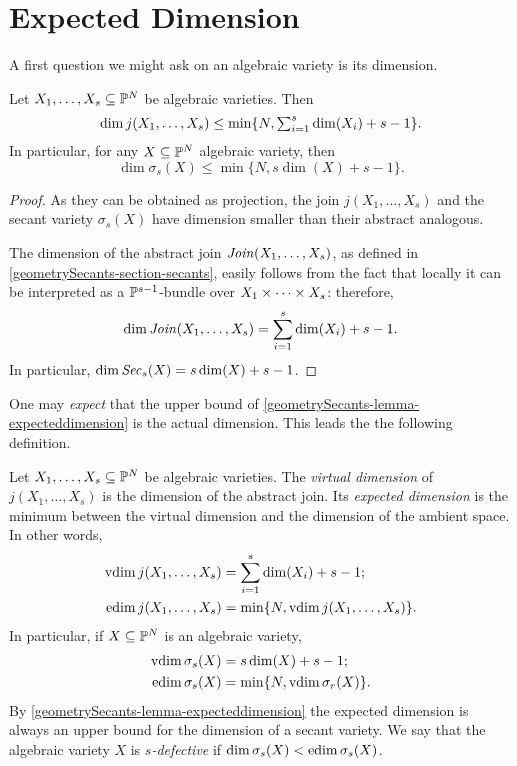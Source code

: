 \section{Expected Dimension}
\label{geometrySecants-section-expectedDimension}
A first question we might ask on an algebraic variety is its dimension. 

\begin{lemma}
\label{geometrySecants-lemma-expecteddimension}
Let $X_1, \ldots , X_s \subseteq \mathbb{P}^N$ be algebraic varieties. Then 
\[
    \dim j(X_1, \ldots , X_s) \leq \min\{ N, \textstyle\sum_{i=1}^s \dim(X_i) + s-1\}.
\]
In particular, for any $X \subseteq \mathbb{P}^N$ algebraic variety, then 
\[
    \dim \sigma_s(X) \leq \min\{ N , s\dim(X) + s - 1\}.
\]
\end{lemma}
\begin{proof}
As they can be obtained as projection, the join $j(X_1,\ldots,X_s)$ and the secant variety $\sigma_s(X)$ have dimension smaller than their abstract analogous.

The dimension of the abstract join $\mathit{Join}(X_1,\ldots,X_s)$, as defined in \ref{geometrySecants-section-secants}, easily follows from the fact that locally it can be interpreted as a $\mathbb{P}^{s-1}$-bundle over $X_1 \times \cdots \times X_s$: therefore, 
    \[
        \dim \mathit{Join}(X_1,\ldots,X_s) = \sum_{i=1}^s \dim(X_i) + s-1.
    \]
    In particular, $\dim \mathit{Sec}_s(X) = s\dim(X) + s-1$.
\end{proof}
One may {\it expect} that the upper bound of \ref{geometrySecants-lemma-expecteddimension} is the actual dimension. This leads the the following definition. 
\begin{definition}
\label{geometrySecants-definition-expecteddimension}
    Let $X_1, \ldots , X_s \subseteq \mathbb{P}^N$ be algebraic varieties. The {\it virtual dimension} of $j(X_1,\ldots,X_s)$ is the dimension of the abstract join. Its {\it expected dimension} is the minimum between the virtual dimension and the dimension of the ambient space. In other words,
    \begin{align*}
        \operatorname{vdim} j(X_1,\ldots,X_s) & = \sum_{i=1}^s \dim(X_i) + s-1; \\ 
        \operatorname{edim} j(X_1,\ldots,X_s) & = \min \{N,\operatorname{vdim} j(X_1,\ldots,X_s)\}.
    \end{align*}
    In particular, if $X \subseteq \mathbb{P}^N$ is an algebraic variety, 
    \begin{align*}
        \operatorname{vdim} \sigma_s(X) & = s\dim(X) + s-1; \\ 
        \operatorname{edim} \sigma_s(X) & = \min \{N,\operatorname{vdim} \sigma_r(X)\}.
    \end{align*}
By \ref{geometrySecants-lemma-expecteddimension} the expected dimension is always an upper bound for the dimension of a secant variety. We say that the algebraic variety $X$ is \emph{$s$-defective} if $\dim \sigma_s(X) < \operatorname{edim}\sigma_s(X)$. 
\end{definition}

